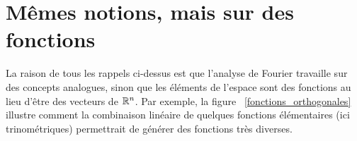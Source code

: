 \section{Mêmes notions, mais sur des fonctions}

La raison de tous les rappels ci-dessus est que l'analyse de Fourier travaille sur des concepts analogues, sinon que les éléments de l'espace sont des fonctions au lieu d'être des vecteurs de $\mathbb{R}^n$. Par exemple, la figure ~\ref{fonctions_orthogonales} illustre comment la combinaison linéaire de quelques fonctions élémentaires (ici trinométriques) permettrait de générer des fonctions très diverses.


\begin{figure}[H]
\begin{center}
\end{center}
\end{figure}
